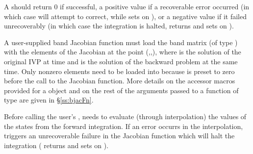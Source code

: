 {
  A  should return 0 if successful, a positive value if a recoverable
  error occurred (in which case {\cvodes} will attempt to correct, while {\cvband} sets
   on ), or a negative 
  value if it failed unrecoverably (in which case the integration is halted, 
  returns  and {\cvdense} sets  on 
  ).
}
{
  A user-supplied band Jacobian function must load the band matrix 
  (of type ) with the elements of the Jacobian at the
  point (,,), where  is the solution
  of the original IVP at time  and  is the solution of the
  backward problem at the same time.  
  Only nonzero elements need to be loaded into
   because  is preset to zero before the call to the
  Jacobian function. More details on the accessor macros provided for
  a  object and on the rest of the arguments passed to a function
  of type  are given in \S\ref{ss:bjacFn}.

  {\warn}Before calling the user's , {\cvodea} needs to evaluate
  (through interpolation) the values of the states from the forward integration. 
  If an error occurrs in the interpolation, {\cvodea} triggers an unrecoverable
  failure in the Jacobian function which will halt the integration
  ( returns  and {\cvband} sets  on 
  ).
}


